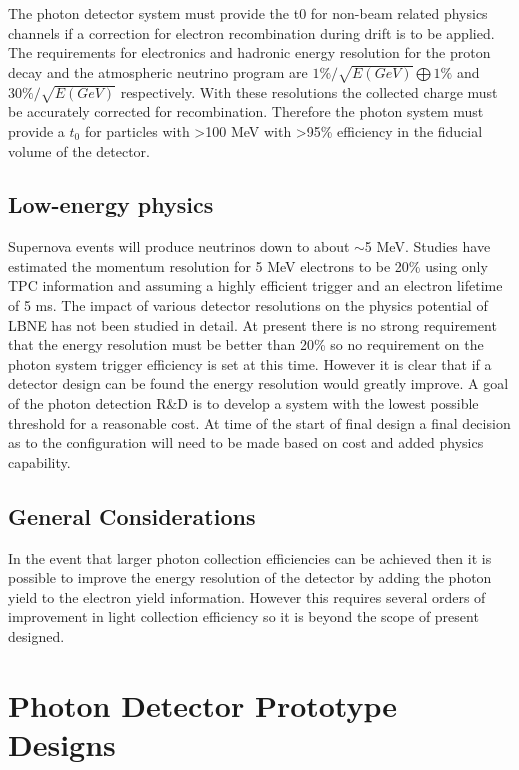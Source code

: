 The photon detector system must provide the t0 for non-beam related
physics channels if a correction for electron recombination during
drift is to be applied. The requirements for electronics and hadronic
energy resolution for the proton decay and the atmospheric neutrino
program are $1\% / \sqrt{E(GeV)} \bigoplus 1\%$ and $30\% /
\sqrt{E(GeV)}$ respectively. With these resolutions the collected
charge must be accurately corrected for recombination. Therefore the
photon system must provide a $t_{0}$ for particles with >100 MeV with
>95\% efficiency in the fiducial volume of the detector.

\subsection{Low-energy physics}

Supernova events will produce neutrinos down to about $\sim$5
MeV. Studies have estimated the momentum resolution for 5 MeV
electrons to be 20\% using only TPC information and assuming a highly
efficient trigger and an electron lifetime of 5 ms. The impact of
various detector resolutions on the physics potential of LBNE has not
been studied in detail. At present there is no strong requirement that
the energy resolution must be better than 20\% so no requirement on
the photon system trigger efficiency is set at this time. However it
is clear that if a detector design can be found the energy resolution
would greatly improve. A goal of the photon detection R\&D is to
develop a system with the lowest possible threshold for a reasonable
cost. At time of the start of final design a final decision as to the
configuration will need to be made based on cost and added physics
capability.

\subsection{General Considerations}
In the event that larger photon collection efficiencies can be
achieved then it is possible to improve the energy resolution of the
detector by adding the photon yield to the electron yield information.
However this requires several orders of improvement in light
collection efficiency so it is beyond the scope of present designed.

\section{Photon Detector Prototype Designs}

